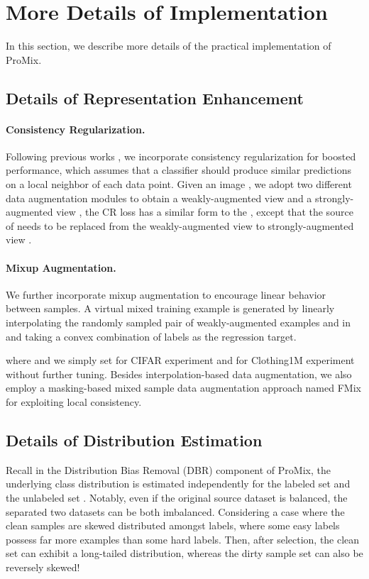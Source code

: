 \documentclass{article}
\begin{document}
\appendix
\section{More Details of Implementation}\label{sec:app_a}
In this section, we describe more details of the practical implementation of ProMix.
\subsection{Details of Representation Enhancement}
\paragraph{Consistency Regularization.} Following previous works \cite{DBLP:conf/iclr/LiSH20}, we incorporate consistency regularization for boosted performance, which assumes that a classifier should produce similar predictions on a local neighbor of each data point. Given an image , we adopt two different data augmentation modules to obtain a weakly-augmented view  and
a strongly-augmented view , the CR loss  has a similar form to the , except that the source of  needs to be replaced from the weakly-augmented view   to strongly-augmented view  . 

\paragraph{Mixup Augmentation.} We further incorporate mixup augmentation to encourage linear behavior between samples. A virtual mixed training example is generated by linearly interpolating
the randomly sampled pair of weakly-augmented examples  and 
in  and taking a convex combination of labels as the
regression target. 

where  and we simply set  for CIFAR experiment and   for Clothing1M experiment without further tuning. Besides interpolation-based data augmentation,
we also employ a masking-based mixed sample data
augmentation approach named FMix \cite{DBLP:journals/corr/abs-2002-12047} for exploiting local consistency. 



\subsection{Details of Distribution Estimation}
Recall in the Distribution Bias Removal (DBR) component of ProMix, the underlying class distribution  is estimated independently for the labeled set  and the unlabeled set . Notably, even if the original source dataset  is balanced, the separated two datasets can be both imbalanced. Considering a case where the clean samples are skewed distributed amongst labels, where some easy labels possess far more examples than some hard labels. Then, after selection, the clean set can exhibit a long-tailed distribution, whereas the dirty sample set can also be reversely skewed!
\end{document}
